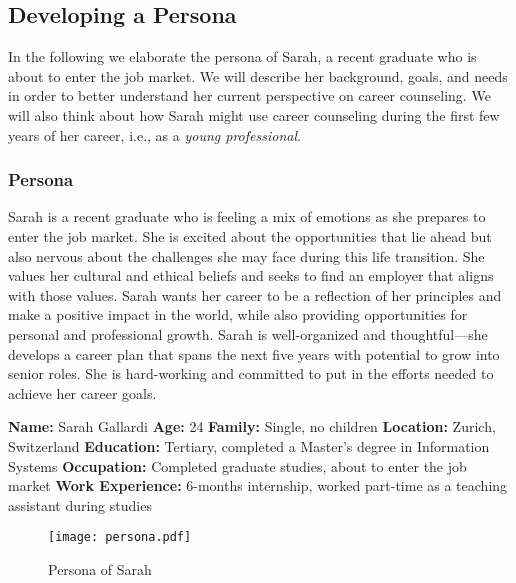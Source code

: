 \subsection{Developing a Persona}

In the following we elaborate the persona of Sarah, a recent graduate who is about to enter the job market. We will
describe her background, goals, and needs in order to better understand her current perspective on career counseling.
We will also think about how Sarah might use career counseling during the first few years of her career, i.e., as
a \textit{young professional}.

\subsubsection*{Persona}

Sarah is a recent graduate who is feeling a mix of emotions as she prepares to enter the job market.
She is excited about the opportunities that lie ahead but also nervous about the challenges she may face during this life transition.
She values her cultural and ethical beliefs and seeks to find an employer that aligns with those values. Sarah wants her career to be
a reflection of her principles and make a positive impact in the world, while also providing opportunities for personal and professional
growth. Sarah is well-organized and thoughtful---she develops a career plan that spans the next five years with potential to grow into
senior roles. She is hard-working and committed to put in the efforts needed to achieve her career goals.
\vspace*{0.2cm}

\noindent \textbf{Name:} Sarah Gallardi
\newline\noindent\textbf{Age:} 24
\newline\noindent\textbf{Family:} Single, no children
\newline\noindent\textbf{Location:} Zurich, Switzerland
\newline\noindent\textbf{Education:} Tertiary, completed a Master's degree in Information Systems
\newline\noindent\textbf{Occupation:} Completed graduate studies, about to enter the job market
\newline\noindent\textbf{Work Experience:} 6-months internship, worked part-time as a teaching assistant during studies

\begin{figure}[h!]
    \centering
    \caption{Persona of Sarah}
    \label{fig:persona}
    \texttt{[image: persona.pdf]}
\end{figure}

